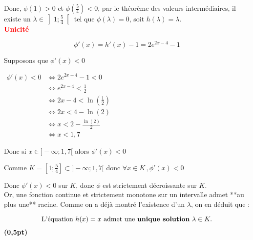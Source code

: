 \documentclass[12pt,a4paper]{article}
\begin{document}
\begin{enumerate}
\begin{enumerate}
                  Donc, \( \phi(1) > 0 \) et \( \phi\left( \frac{5}{4} \right) < 0 \), par le théorème des valeurs intermédiaires, il existe un \( \lambda \in \left] 1 ; \frac{5}{4} \right[ \) tel que \( \phi(\lambda) = 0 \), soit \( h(\lambda) = \lambda \).\\

                      \textcolor{red}{\textbf{Unicité}}

                      \[
                          \phi'(x) = h'(x) - 1 = 2e^{2x - 4} - 1
                      \]

                      Supposons que \(\phi'(x)<0\)

                      \(
                      \begin{aligned}
                          \phi'(x) < 0 & \Longleftrightarrow 2e^{2x - 4} - 1 < 0                  \\
                                       & \Longleftrightarrow e^{2x - 4} < \frac{1}{2}             \\
                                       & \Longleftrightarrow 2x - 4 < \ln\left(\frac{1}{2}\right) \\
                                       & \Longleftrightarrow 2x < 4 - \ln(2)                      \\
                                       & \Longleftrightarrow x < 2 - \frac{\ln(2)}{2}             \\
                                       & \Longleftrightarrow x < 1,7
                      \end{aligned}
                      \)

                      Donc si \( x\in ]-\infty ;1,7[ \) alors \(\phi'(x) < 0\)

                  Comme \( K = \left[1 ; \frac{5}{4} \right] \subset ]-\infty ;1,7[ \) donc \( \forall x \in K\, , \phi'(x) < 0\)

                  Donc \( \phi'(x) < 0 \) sur \( K \), donc \( \phi \) est strictement décroissante sur \( K \).\\

                  Or, une fonction continue et strictement monotone sur un intervalle admet **au plus une** racine. Comme on a déjà montré l’existence d’un \( \lambda \), on en déduit que :

                  \[
                      \text{L’équation } h(x) = x \text{ admet une \textbf{unique solution} } \lambda \in K.
                  \] \hfill \textbf{(0,5pt)}


\end{enumerate}
\end{enumerate}
\end{document}
